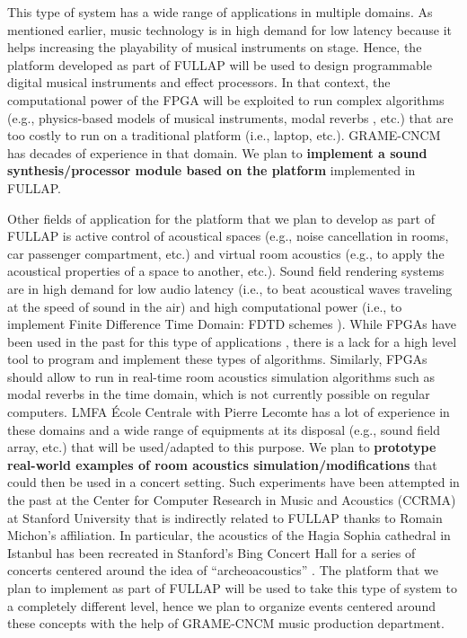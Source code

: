 \documentclass[a4paper,10pt]{article}
\newcommand{\PP}{FULLAP}
\begin{document}
This type of system has a wide range of applications in multiple domains. As mentioned earlier, music technology is in high demand for low latency because it helps increasing the playability of musical instruments on stage. Hence, the platform developed as part of \PP{} will be used to design programmable digital musical instruments and effect processors. In that context, the computational power of the FPGA will be exploited to run complex algorithms (e.g., physics-based models of musical instruments, modal reverbs \cite{Abel2009}, etc.) that are too costly to run on a traditional platform (i.e., laptop, etc.). GRAME-CNCM has decades of experience in that domain. We plan to \textbf{implement a sound synthesis/processor module based on the platform} implemented in \PP{}.

Other fields of application for the platform that we plan to develop as part of \PP{} is active control of acoustical spaces (e.g., noise cancellation in rooms, car passenger compartment, etc.) and virtual room acoustics (e.g., to apply the acoustical properties of a space to another, etc.). Sound field rendering systems are in high demand for low audio latency (i.e., to beat acoustical waves traveling at the speed of sound in the air) and high computational power (i.e., to implement Finite Difference Time Domain: FDTD schemes \cite{Bilbao2009}). While FPGAs have been used in the past for this type of applications \cite{Tan2019}, there is a lack for a high level tool to program and implement these types of algorithms. Similarly, FPGAs should allow to run in real-time room acoustics simulation algorithms such as modal reverbs \cite{Abel2019} in the time domain, which is not currently possible on regular computers. LMFA École Centrale with Pierre Lecomte has a lot of experience in these domains and a wide range of equipments at its disposal (e.g., sound field array, etc.) that will be used/adapted to this purpose. We plan to \textbf{prototype real-world examples of room acoustics simulation/modifications} that could then be used in a concert setting. Such experiments have been attempted in the past at the Center for Computer Research in Music and Acoustics (CCRMA) at Stanford University that is indirectly related to \PP{} thanks to Romain Michon's affiliation. In particular, the acoustics of the Hagia Sophia cathedral in Istanbul has been recreated in Stanford's Bing Concert Hall for a series of concerts centered around the idea of ``archeoacoustics'' \cite{Abel2009}. The platform that we plan to implement as part of \PP{} will be used to take this type of system to a completely different level, hence we plan to organize events centered around these concepts with the help of GRAME-CNCM music production department.
\end{document}
